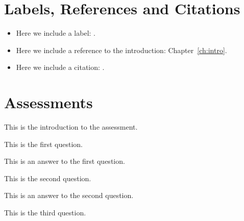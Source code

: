 \documentclass{camel}
\begin{document}
\chapter{Labels, References and Citations}

\begin{itemize}
\item Here we include a label: \label{it:first-item}.
\item Here we include a reference to the introduction: Chapter~\ref{ch:intro}.
\item Here we include a citation: \cite{evans02}.
\end{itemize}

\chapter{Assessments}\label{ch:assessments}

\begin{assessment}\label{ass:demo}
This is the introduction to the assessment.
\begin{questions} 
\question This is the first question.\label{qu:first-question}
\begin{answer} 
This is an answer to the first question.
\end{answer} 
\question This is the second question.\label{qu:second-question}
\begin{answer} 
This is an answer to the second question.
\end{answer} 
\question This is the third question.\label{qu:third-question}
\end{questions} 
\end{assessment}
\end{document}
